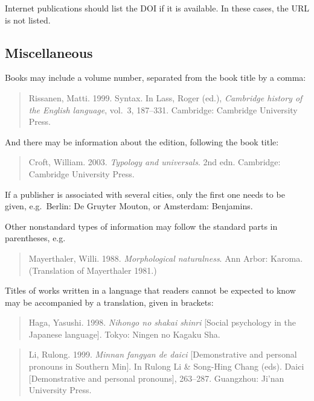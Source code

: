 \documentclass[a4paper]{article}
\newenvironment{gsrexq}{\begin{quote}\color{blue}}{\end{quote}}
\newcommand{\gsrex}[1]{{\color{blue}#1}}
\begin{document}
Internet publications should list the DOI if it is available. In these cases, the URL is not listed. 

\subsection{Miscellaneous}\label{sec:miscellaneous}

Books may include a volume number, separated from the book title by a
comma: 

\begin{gsrexq}
Rissanen, Matti. 1999. Syntax. In Lass, Roger (ed.), \textit{Cambridge history of the English language}, vol.~3, 187--331. 
Cambridge: Cambridge University Press. 
\end{gsrexq}

And there may be information about the edition,
following the book title: 

\begin{gsrexq}
Croft, William. 2003. \textit{Typology and universals}.
2nd edn. Cambridge: Cambridge University Press.
\end{gsrexq}

If a publisher is
associated with several cities, only the first one needs to be given,
e.g.~\gsrex{Berlin: De Gruyter Mouton}, or \gsrex{Amsterdam: Benjamins}.

Other
nonstandard types of information may follow the standard parts in
parentheses, e.g.~

\begin{gsrexq}
Mayerthaler, Willi. 1988. \textit{Morphological naturalness}.
Ann Arbor: Karoma. (Translation of Mayerthaler 1981.)
\end{gsrexq}

Titles of works
written in a language that readers cannot be expected to know may be
accompanied by a translation, given in brackets: 


\begin{gsrexq}
Haga, Yasushi. 1998.
\textit{Nihongo no shakai shinri} [Social psychology in the Japanese
language]. Tokyo: Ningen no Kagaku Sha.
\end{gsrexq}


\begin{gsrexq}
Li, Rulong. 1999. \textit{Minnan fangyan de daici} 
[Demonstrative and personal pronouns in Southern Min]. 
In Rulong Li \& Song-Hing Chang (eds).
Daici [Demonstrative and personal pronouns], 263--287. 
Guangzhou: Ji'nan University Press.
\end{gsrexq}
\end{document}
